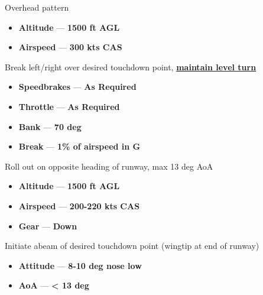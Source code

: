 \begin{checklistenumerate}
{\begin{tikzpicture}[figstyle]
        \end{tikzpicture}
        \caption{Overhead pattern}
        \label{fig:proc_basic:landing:overhead}
    }


    \begin{itemize}
        \item \textbf{Altitude} --- \textbf{1500 ft AGL}
        \item \textbf{Airspeed} --- \textbf{300 kts CAS}
    \end{itemize}
    \label{subsec:proc_basic:to_ldg:ldg:overhead}
    Break left/right over desired touchdown point,
    \textbf{\underline{maintain level turn}}

    \begin{itemize}
        \item \textbf{Speedbrakes} --- \textbf{As Required}
        \item \textbf{Throttle} --- \textbf{As Required}
        \item \textbf{Bank} --- \textbf{70 deg}
        \item \textbf{Break} --- \textbf{1\% of airspeed in G}
    \end{itemize}
    \label{subsec:proc_basic:to_ldg:ldg:downwind}
    Roll out on opposite heading of runway, max 13 deg AoA

    \begin{itemize}
        \item \textbf{Altitude} --- \textbf{1500 ft AGL}
        \item \textbf{Airspeed} --- \textbf{200-220 kts CAS}
        \item \textbf{Gear} --- \textbf{Down}
    \end{itemize}

    \label{subsec:proc_basic:to_ldg:ldg:base}
    Initiate abeam of desired touchdown point (wingtip at end of runway)

    \begin{itemize}
        \item \textbf{Attitude} --- \textbf{8-10 deg nose low}
        \item \textbf{AoA} --- \textbf{< 13 deg}
    \end{itemize}


\end{checklistenumerate}

